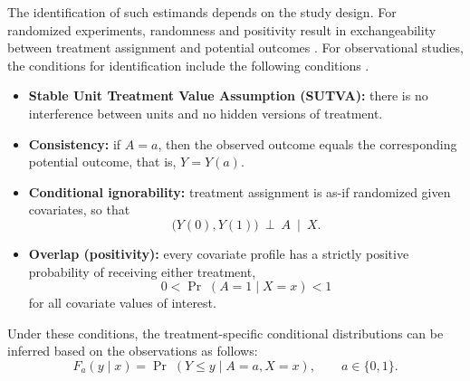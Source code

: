 \documentclass[11pt]{article}\usepackage[]{graphicx}\usepackage[]{xcolor}
\begin{document}
The identification of such estimands depends on the study design. For randomized experiments, randomness and positivity result in exchangeability between treatment assignment and potential outcomes \citep{ImbensRubin2015}. For observational studies, the conditions for identification include the following conditions \citep{RosenbaumRubin1983,ImbensRubin2015}.

\begin{itemize}
\item \textbf{Stable Unit Treatment Value Assumption (SUTVA):} there
is no interference between units and no hidden versions of treatment.
\item \textbf{Consistency:} if $A=a$, then the observed outcome equals
the corresponding potential outcome, that is, $Y=Y(a)$.
\item \textbf{Conditional ignorability:} treatment assignment is
as-if randomized given covariates, so that
\begin{equation*}
\bigl(Y(0),Y(1)\bigr)\ \perp\ A \ \mid\ X.
\end{equation*}
\item \textbf{Overlap (positivity):} every covariate profile has a
strictly positive probability of receiving either treatment,
\begin{equation*}
0<\Pr\;(A=1\mid X=x)<1
\end{equation*}
for all covariate values of interest.
\end{itemize}
Under these conditions, the treatment-specific conditional
distributions can be inferred based on the observations as follows:
\begin{equation*}
F_a(y\mid x)=\Pr\;(Y\le y\mid A=a,X=x),\qquad a\in\{0,1\}.
\end{equation*}
\end{document}
